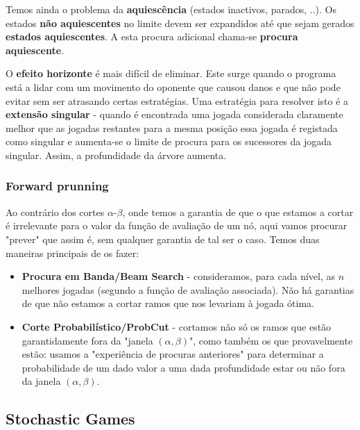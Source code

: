 \documentclass[11pt]{article}
\begin{document}
Temos ainda o problema da \textbf{aquiescência} (estados inactivos, parados, ..). Os estados \textbf{não aquiescentes} no limite devem ser expandidos até que sejam gerados \textbf{estados aquiescentes}. A esta procura adicional chama-se \textbf{procura aquiescente}.\vspace{4pt}

O \textbf{efeito horizonte} é mais difícil de eliminar. Este surge quando o programa está a lidar com um movimento do oponente que causou danos e que não pode evitar sem ser atrasando certas estratégias. Uma estratégia para resolver isto é a \textbf{extensão singular} - quando é encontrada uma jogada considerada claramente melhor que as jogadas restantes para a mesma posição essa jogada é registada como singular e aumenta-se o limite de procura para os sucessores da jogada singular. Assim, a profundidade da árvore aumenta.

\subsubsection{Forward prunning}

Ao contrário dos cortes $\alpha$-$\beta$, onde temos a garantia de que o que estamos a cortar é irrelevante para o valor da função de avaliação de um nó, aqui vamos procurar "prever" que assim é, sem qualquer garantia de tal ser o caso. Temos duas maneiras principais de os fazer:
\begin{itemize}
    \item \textbf{Procura em Banda/Beam Search} - consideramos, para cada nível, as $n$ melhores jogadas (segundo a função de avaliação associada). Não há garantias de que não estamos a cortar ramos que nos levariam à jogada ótima.
    \item \textbf{Corte Probabilístico/ProbCut} - cortamos não só os ramos que estão garantidamente fora da "janela $(\alpha,\beta)$", como também os que provavelmente estão: usamos a "experiência de procuras anteriores" para determinar a probabilidade de um dado valor a uma dada profundidade estar ou não fora da janela $(\alpha,\beta)$.
\end{itemize}

\subsection{Stochastic Games}
\end{document}
